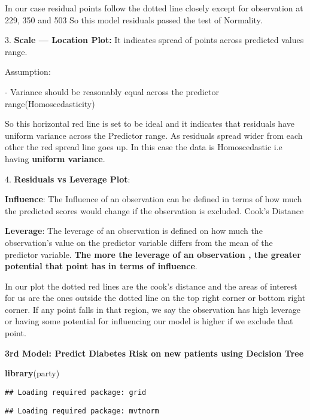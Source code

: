\documentclass[
]{article}
\newenvironment{Shaded}{\begin{snugshade}}{\end{snugshade}}
\newcommand{\FunctionTok}[1]{\textcolor[rgb]{0.13,0.29,0.53}{\textbf{#1}}}
\newcommand{\NormalTok}[1]{#1}
\begin{document}
In our case residual points follow the dotted line closely except for
observation at 229, 350 and 503 So this model residuals passed the test
of Normality.

3. \textbf{Scale --- Location Plot:} It indicates spread of points
across predicted values range.

Assumption:

- Variance should be reasonably equal across the predictor
range(Homoscedasticity)

So this horizontal red line is set to be ideal and it indicates that
residuals have uniform variance across the Predictor range. As residuals
spread wider from each other the red spread line goes up. In this case
the data is Homoscedastic i.e having \textbf{uniform variance}.

4. \textbf{Residuals vs Leverage Plot}:

\textbf{Influence}: The Influence of an observation can be defined in
terms of how much the predicted scores would change if the observation
is excluded. Cook's Distance

\textbf{Leverage}: The leverage of an observation is defined on how much
the observation's value on the predictor variable differs from the mean
of the predictor variable. \textbf{The more the leverage of an
observation , the greater potential that point has in terms of
influence}.

In our plot the dotted red lines are the cook's distance and the areas
of interest for us are the ones outside the dotted line on the top right
corner or bottom right corner. If any point falls in that region, we say
the observation has high leverage or having some potential for
influencing our model is higher if we exclude that point.

\textbf{3rd Model: Predict Diabetes Risk on new patients using Decision
Tree}

\begin{Shaded}
\begin{Highlighting}[]
\FunctionTok{library}\NormalTok{(party)}
\end{Highlighting}
\end{Shaded}

\begin{verbatim}
## Loading required package: grid
\end{verbatim}

\begin{verbatim}
## Loading required package: mvtnorm
\end{verbatim}
\end{document}
